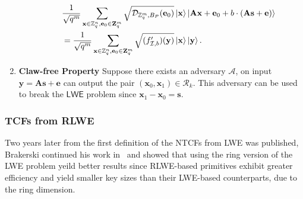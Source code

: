 \begin{defn}
\begin{enumerate}
\begin{itemize}
\begin{align}
            &\frac{1}{\sqrt{q^m}}\sum_{\mathbf{x}\in\mathbb{Z}^n_q,\mathbf{e}_0\in\mathbf{Z}^m_q} \sqrt{\mathcal{D}_{\mathbb{Z}^m_q,B_P}(\mathbf{e}_0)}\ket{\mathbf{x}}\ket{\mathbf{A}\mathbf{x}+\mathbf{e}_0+b\cdot (\mathbf{A}\mathbf{s}+\mathbf{e})}\\
            &=\frac{1}{\sqrt{q^m}}\sum_{\mathbf{x}\in\mathbb{Z}^n_q,\mathbf{e}_0\in\mathbf{Z}^m_q} \sqrt{(f_{\mathcal{I},b}')(\mathbf{y})}\ket{\mathbf{x}}\ket{\mathbf{y}}.
            \label{eq:LWEtcfqstate}
        \end{align}
        
    \end{itemize}
     
    \item \textbf{Claw-free Property} Suppose there exists an adversary $\mathcal{A}$, on input $\mathbf{y}=\mathbf{A}\mathbf{s}+\mathbf{e}$ can output the pair $(\mathbf{x}_0,\mathbf{x}_1)\in\mathcal{R}_k$. This adversary can be used to break the $\mathsf{LWE}$ problem since $\mathbf{x}_1-\mathbf{x}_0=\mathbf{s}$.
    
\end{enumerate}
\end{defn}


\subsubsection{TCFs from RLWE}
Two years later from the first definition of the NTCFs from LWE was published, Brakerski continued his work in~\cite{BrakerskiProofofQuantumness} and showed that using the ring version of the LWE problem yeild better results since RLWE-based primitives exhibit greater efficiency and yield smaller key sizes than their LWE-based counterparts, due to the ring dimension. 

